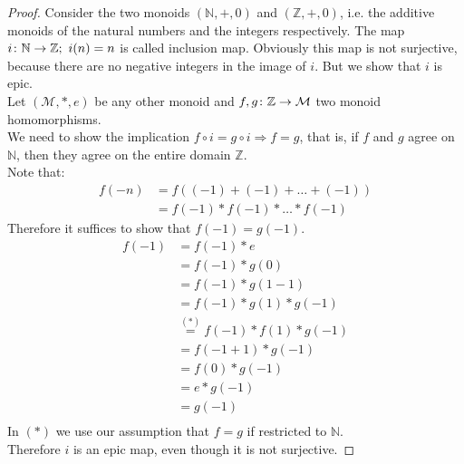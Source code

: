 \begin{proof}
  Consider the two monoids $(\mathbb{N}, +, 0)$ and $(\mathbb{Z}, +, 0)$, i.e. the
  additive monoids of the natural numbers and the integers respectively.
  The map $i \from \mathbb{N} \to \mathbb{Z}; \ i(n) = n$ is called inclusion map.
  Obviously this map is not surjective, because there are no negative integers
  in the image of $i$. But we show that $i$ is epic.\\
  Let $(\mathcal{M}, *, e)$ be any other monoid and $f, g \from \mathbb{Z} \to \mathcal{M}$ two
  monoid homomorphisms.\\
  We need to show the implication $f \circ i = g \circ i \Rightarrow f = g$, that is,
  if $f$ and $g$ agree on $\mathbb{N}$, then they agree on the entire domain $\mathbb{Z}$.\\
  Note that:
  \begin{align*}
    f(-n) &= f ((-1) + (-1) + \dots + (-1))\\
          &= f (-1) * f(-1) * \dots * f(-1)
  \end{align*}
  Therefore it suffices to show that $f(-1) = g(-1)$.
  \begin{align*}
    f(-1) &= f(-1) * e \\
          &= f(-1) * g(0) \\
          &= f(-1) * g(1 - 1) \\
          &= f(-1) * g(1) * g(-1) \\
          &\overset{(*)}{=} f(-1) * f(1) * g(-1) \\
          &= f(-1 + 1) * g(-1) \\
          &= f(0) * g(-1) \\
          &= e * g(-1) \\
          &= g(-1) \\ 
  \end{align*}
  In $(*)$ we use our assumption that $f=g$ if restricted to $\mathbb{N}$.\\
  Therefore $i$ is an epic map, even though it is not surjective.
\end{proof}

